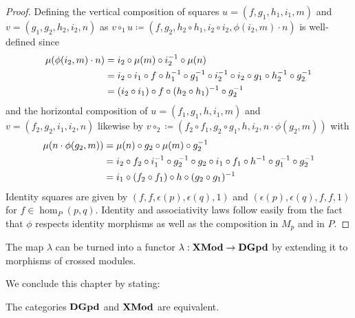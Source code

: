 \begin{proof}
Defining the vertical composition of squares $u = (f, g_1, h_1, i_1, m)$ and
$v = (g_1, g_2, h_2, i_2, n)$ as $v \circ_1 u \coloneqq 
(f, g_2, h_2 \circ h_1, i_2 \circ i_2, \phi(i_2, m) \cdot n)$ is well-defined
since
\begin{align*}
\mu(\phi(i_2,m) \cdot n) &= i_2 \circ \mu(m) \circ i_2^{-1} \circ \mu(n)\\
	&= i_2 \circ i_1 \circ f \circ h_1^{-1} \circ g_1^{-1} \circ
		i_2^{-1} \circ i_2 \circ g_1 \circ h_2^{-1} \circ g_2^{-1} \\
	&= (i_2 \circ i_1) \circ f \circ (h_2 \circ h_1)^{-1} \circ g_2^{-1}
\end{align*}
and the horizontal composition of $u = (f_1, g_1, h, i_1, m)$ and
$v = (f_2, g_2, i_1, i_2, n)$ likewise by $v \circ_2 \coloneqq
(f_2 \circ f_1, g_2 \circ g_1, h, i_2, n \cdot \phi(g_2,m))$ with
\begin{align*}
\mu(n \cdot \phi(g_2,m)) &= \mu(n) \circ g_2 \circ \mu(m) \circ g_2^{-1} \\
	&= i_2 \circ f_2 \circ i_1^{-1} \circ g_2^{-1} \circ g_2 \circ
		i_1 \circ f_1 \circ h^{-1} \circ g_1^{-1} \circ g_2^{-1} \\
	&= i_1 \circ (f_2 \circ f_1) \circ h \circ (g_2 \circ g_1)^{-1}
\end{align*}
Identity squares are given by $(f,f,\epsilon(p),\epsilon(q),1)$ and
$(\epsilon(p),\epsilon(q),f,f,1)$ for $f \in \hom_P(p,q)$. Identity and
associativity laws follow easily from the fact that $\phi$ respects identity
morphisms as well as the composition in $M_p$ and in $P$.
\end{proof}

\begin{defn}
The map $\lambda$ can be turned into a functor $\lambda : \mathbf{XMod} \to \mathbf{DGpd}$ by
extending it to morphisms of crossed modules.
\end{defn}

We conclude this chapter by stating:
\begin{thm}
The categories $\mathbf{DGpd}$ and $\mathbf{XMod}$ are equivalent.
\end{thm}

